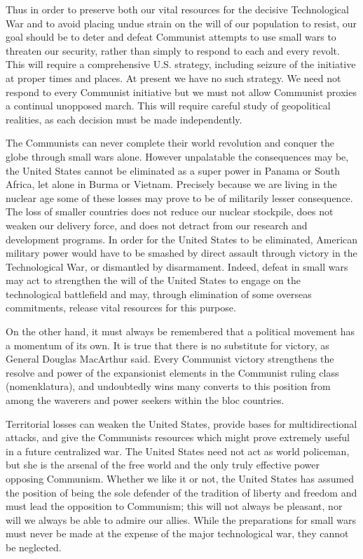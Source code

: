 Thus in order to preserve both our vital resources for the decisive Technological War and to avoid placing undue strain on the will of our population to resist, our goal should be to deter and defeat Communist attempts to use small wars to threaten our security, rather than simply to respond to each and every revolt. This will require a comprehensive U.S. strategy, including seizure of the initiative at proper times and places. At present we have no such strategy. We need not respond to every Communist initiative but we must not allow Communist proxies a continual unopposed march. This will require careful study of geopolitical realities, as each decision must be made independently.

The Communists can never complete their world revolution and conquer the globe through small wars alone. However unpalatable the consequences may be, the United States cannot be eliminated as a super power in Panama or South Africa, let alone in Burma or Vietnam. Precisely because we are living in the nuclear age some of these losses may prove to be of militarily lesser consequence. The loss of smaller countries does not reduce our nuclear stockpile, does not weaken our delivery force, and does not detract from our research and development programs. In order for the United States to be eliminated, American military power would have to be smashed by direct assault through victory in the Technological War, or dismantled by disarmament. Indeed, defeat in small wars may act to strengthen the will of the United States to engage on the technological battlefield and may, through elimination of some overseas commitments, release vital resources for this purpose.

On the other hand, it must always be remembered that a political movement has a momentum of its own. It is true that there is no substitute for victory, as General Douglas MacArthur said. Every Communist victory strengthens the resolve and power of the expansionist elements in the Communist ruling class (nomenklatura), and undoubtedly wins many converts to this position from among the waverers and power seekers within the bloc countries.

Territorial losses can weaken the United States, provide bases for multidirectional attacks, and give the Communists resources which might prove extremely useful in a future centralized war. The United States need not act as world policeman, but she is the arsenal of the free world and the only truly effective power opposing Communism. Whether we like it or not, the United States has assumed the position of being the sole defender of the tradition of liberty and freedom and must lead the opposition to Communism; this will not always be pleasant, nor will we always be able to admire our allies. While the preparations for small wars must never be made at the expense of the major technological war, they cannot be neglected.

